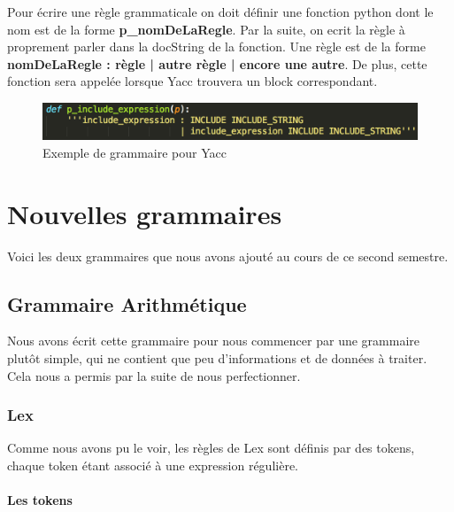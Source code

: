 \documentclass[a4paper,12pt]{article}
\begin{document}
		Pour écrire une règle grammaticale on doit définir une fonction python dont le nom est de la forme \textbf{p\_nomDeLaRegle}. Par la suite, on ecrit la règle à proprement parler dans la docString de la fonction. Une règle est de la forme \textbf{nomDeLaRegle : règle | autre règle | encore une autre}. De plus, cette fonction sera appelée lorsque Yacc trouvera un block correspondant.
		
		\begin{figure}[h!]
				\begin{center}
					\includegraphics[scale=0.45]{images/yaccC}
					\caption{Exemple de grammaire pour Yacc}
				\end{center}
		\end{figure}



\section{Nouvelles grammaires}

	Voici les deux grammaires que nous avons ajouté au cours de ce second semestre.

	\subsection{Grammaire Arithmétique}
	
		Nous avons écrit cette grammaire pour nous commencer par une grammaire plutôt simple, qui ne contient que peu d'informations et de données à traiter. Cela nous a permis par la suite de nous perfectionner.

		\subsubsection{Lex}
			
			Comme nous avons pu le voir, les règles de Lex sont définis par des tokens, chaque token étant associé à une expression régulière. 

			\paragraph{Les tokens}
\end{document}
